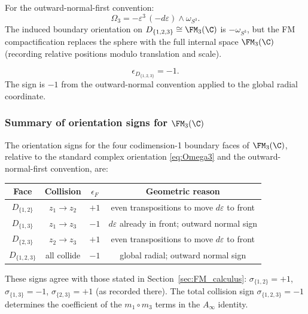 For the outward-normal-first convention:
\[
\Omega_3 = -\varepsilon^3\,(-d\varepsilon)\wedge\omega_{S^3}.
\]
The induced boundary orientation on $D_{\{1,2,3\}} \cong \FM_3(\C)$ is $-\omega_{S^3}$, but the FM compactification replaces the sphere with the full internal space $\FM_3(\C)$ (recording relative positions modulo translation and scale).

\begin{equation}
\label{eq:eps-D123}
\boxed{\epsilon_{D_{\{1,2,3\}}} = -1.}
\end{equation}
The sign is $-1$ from the outward-normal convention applied to the global radial coordinate.

\subsubsection{\texorpdfstring{Summary of orientation signs for $\FM_3(\C)$}{Summary of orientation signs for FM 3(C)}}

\begin{proposition}[Orientation signs for $k=3$]
\label{prop:orient-signs-k3}
The orientation signs for the four codimension-1 boundary faces of $\FM_3(\C)$, relative to the standard complex orientation \eqref{eq:Omega3} and the outward-normal-first convention, are:
\begin{center}
\renewcommand{\arraystretch}{1.3}
\begin{tabular}{c|c|c|c}
\textbf{Face} & \textbf{Collision} & $\epsilon_F$ & \textbf{Geometric reason} \\
\hline
$D_{\{1,2\}}$ & $z_1\to z_2$ & $+1$ & even transpositions to move $d\varepsilon$ to front \\
$D_{\{1,3\}}$ & $z_1\to z_3$ & $-1$ & $d\varepsilon$ already in front; outward normal sign \\
$D_{\{2,3\}}$ & $z_2\to z_3$ & $+1$ & even transpositions to move $d\varepsilon$ to front \\
$D_{\{1,2,3\}}$ & all collide & $-1$ & global radial; outward normal sign
\end{tabular}
\end{center}
\end{proposition}

\begin{remark}
These signs agree with those stated in Section~\ref{sec:FM_calculus}: $\sigma_{\{1,2\}} = +1$, $\sigma_{\{1,3\}} = -1$, $\sigma_{\{2,3\}} = +1$ (as recorded there). The total collision sign $\sigma_{\{1,2,3\}} = -1$ determines the coefficient of the $m_1 \circ m_3$ terms in the $A_\infty$ identity.
\end{remark}

